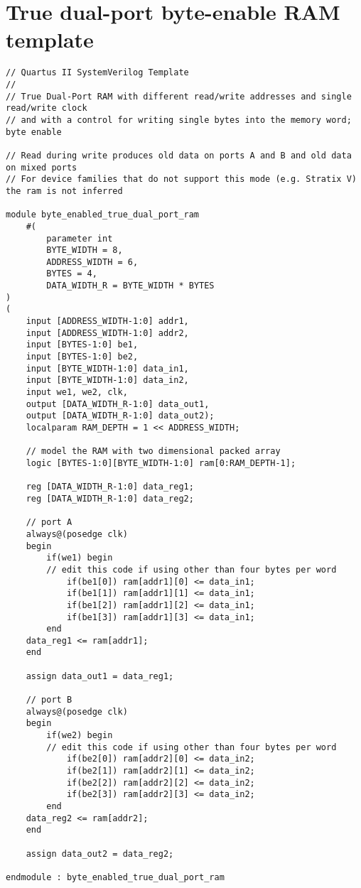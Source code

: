 \section{\label{sec:ramtempcode}True dual-port byte-enable RAM template}
\lstset{language=SystemVerilog,style=Verilogstyle}
\begin{lstlisting}
// Quartus II SystemVerilog Template
//
// True Dual-Port RAM with different read/write addresses and single read/write clock
// and with a control for writing single bytes into the memory word; byte enable

// Read during write produces old data on ports A and B and old data on mixed ports
// For device families that do not support this mode (e.g. Stratix V) the ram is not inferred

module byte_enabled_true_dual_port_ram
	#(
		parameter int
		BYTE_WIDTH = 8,
		ADDRESS_WIDTH = 6,
		BYTES = 4,
		DATA_WIDTH_R = BYTE_WIDTH * BYTES
)
(
	input [ADDRESS_WIDTH-1:0] addr1,
	input [ADDRESS_WIDTH-1:0] addr2,
	input [BYTES-1:0] be1,
	input [BYTES-1:0] be2,
	input [BYTE_WIDTH-1:0] data_in1, 
	input [BYTE_WIDTH-1:0] data_in2, 
	input we1, we2, clk,
	output [DATA_WIDTH_R-1:0] data_out1,
	output [DATA_WIDTH_R-1:0] data_out2);
	localparam RAM_DEPTH = 1 << ADDRESS_WIDTH;

	// model the RAM with two dimensional packed array
	logic [BYTES-1:0][BYTE_WIDTH-1:0] ram[0:RAM_DEPTH-1];

	reg [DATA_WIDTH_R-1:0] data_reg1;
	reg [DATA_WIDTH_R-1:0] data_reg2;

	// port A
	always@(posedge clk)
	begin
		if(we1) begin
		// edit this code if using other than four bytes per word
			if(be1[0]) ram[addr1][0] <= data_in1;
			if(be1[1]) ram[addr1][1] <= data_in1;
			if(be1[2]) ram[addr1][2] <= data_in1;
			if(be1[3]) ram[addr1][3] <= data_in1;
		end
	data_reg1 <= ram[addr1];
	end

	assign data_out1 = data_reg1;
   
	// port B
	always@(posedge clk)
	begin
		if(we2) begin
		// edit this code if using other than four bytes per word
			if(be2[0]) ram[addr2][0] <= data_in2;
			if(be2[1]) ram[addr2][1] <= data_in2;
			if(be2[2]) ram[addr2][2] <= data_in2;
			if(be2[3]) ram[addr2][3] <= data_in2;
		end
	data_reg2 <= ram[addr2];
	end

	assign data_out2 = data_reg2;

endmodule : byte_enabled_true_dual_port_ram
\end{lstlisting}
\lstset{language=LLVM,style=Cstyle}
